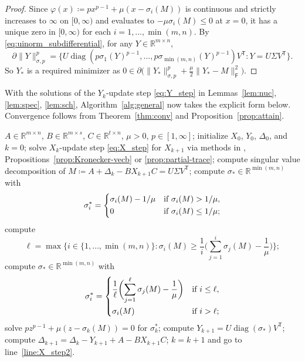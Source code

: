 \documentclass[11pt,reqno]{amsart}
\newcommand{\tp}{{\scriptscriptstyle\mathsf{T}}}
\newcommand{\st}{\sigma}
\newcommand{\F}{{\scriptscriptstyle\mathsf{F}}}
\DeclareMathOperator{\diag}{diag}
\theoremstyle{definition}
\numberwithin{equation}{section}
\newcommand{\R}{\mathbb{R}}
\begin{document}
\begin{proof}
Since $\varphi(x) \coloneqq px^{p-1}+\mu(x-\sigma_i(M))$ is continuous and strictly increases to $\infty$ on $[0,\infty)$ and evaluates to $-\mu\sigma_i(M) \leq 0$ at $x=0$, it has a unique zero in $[0,\infty)$ for each $i = 1, \dots, \min(m,n)$. By \eqref{eq:uinorm_subdifferential}, for any $Y \in \R^{m \times n}$,
\[
\partial \lVert Y \rVert_{\st,p}^p = \bigl\{U\diag(p\sigma_1(Y)^{p-1}, \dots, p\sigma_{\min(m,n)}(Y)^{p-1})V^\tp : Y = U\Sigma V^\tp\bigr\}.
\] 
So $Y_*$ is a required minimizer as $0 \in \partial  \bigl( \lVert Y_* \rVert_{\st,p}^p + \tfrac{\mu}{2} \lVert Y_* - M \rVert_\F^2\bigr)$.
\end{proof}

With the solutions of the $Y_k$-update step \eqref{eq:Y_step} in Lemmas~\ref{lem:nuc}, \ref{lem:spec}, \ref{lem:sch}, Algorithm~\ref{alg:general} now takes the explicit form below. Convergence follows from Theorem~\ref{thm:conv} and Proposition~\ref{prop:attain}.

\begin{algorithm}
\caption{Algorithm for generalized nearness in Schatten norms}\label{alg:Schatten}
\begin{algorithmic}[1]
\Require $ A \in \R^{m \times n}$, $B \in \R^{m \times s}$, $C \in \R^{t \times n} $, $\mu > 0$, $p \in [1,\infty]$;
\State initialize $X_0$, $Y_0$, $\Delta_0$, and $k = 0$;
\State solve $X_k$-update step \eqref{eq:X_step} for $X_{k+1}$ via methods in \cite{li22}, Propositions~\ref{prop:Kronecker-vecb} or \ref{prop:partial-trace}; \label{line:X_step2}
\State compute singular value decomposition of $M \coloneqq A + \Delta_k - BX_{k+1}C = U \Sigma V^\tp$;
    \State compute $\sigma_* \in \R^{\min (m,n)}$ with
    \[
    \sigma_i^* = 
        \begin{dcases}
        \sigma_i (M)-1/\mu  & \text{if } \sigma_i (M) >1/\mu,\\
        0 & \text{if } \sigma_i(M) \le 1/\mu;
        \end{dcases} 
    \]
    \State compute 
    \[\ell = \max\biggl\{ i \in \{1,\dots, \min(m,n)\} :  \sigma_i(M) \ge \frac{1}{i}\biggl(\sum_{j=1}^i \sigma_j(M) -\frac{1}{\mu}\biggr) \biggr\};\]
    \State compute $\sigma_* \in \R^{\min (m,n)}$ with
    \[
    \sigma_i^* = 
    \begin{dcases}
    \frac{1}{\ell}\biggl(\sum_{j=1}^\ell \sigma_j(M) -\frac{1}{\mu} \biggr)  & \text{if } i \le \ell,\\
    \sigma_i(M) &\text{if } i > \ell;
    \end{dcases}
    \]
\Else 
        \State solve $pz^{p-1} + \mu (z - \sigma_k(M)) = 0$ for $\sigma_k^*$;
    \EndFor
\EndIf
\State compute $Y_{k+1} = U \diag(\sigma_*) V^\tp$;
\State compute $\Delta_{k+1} = \Delta_k - Y_{k+1} + A - BX_{k+1}C$;
\State $k = k+1$ and go to line~\eqref{line:X_step2}.
\end{algorithmic}
\end{algorithm}
\end{document}
